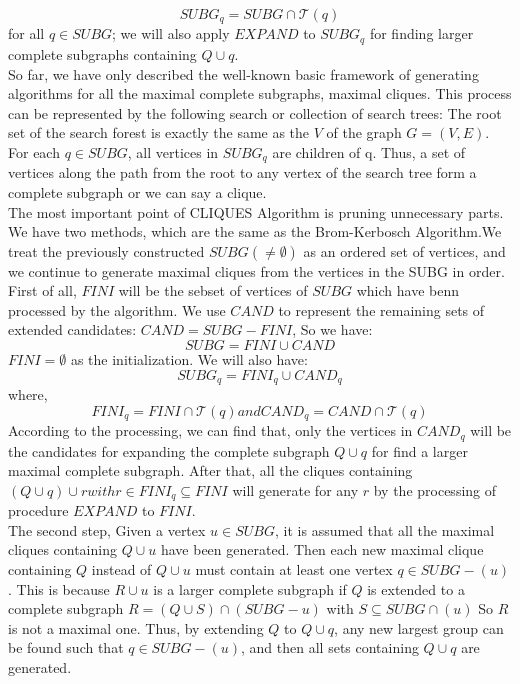 \begin{displaymath}
SUBG_q = SUBG \cap \mathcal{T}(q)
\end{displaymath}
for all $q \in SUBG$; we will also apply $EXPAND$ to $SUBG_q$ for finding larger complete subgraphs containing $Q\cup{q}$.\\
So far, we have only described the well-known basic framework of generating algorithms for all the maximal complete subgraphs, maximal cliques. This process can be represented by the following search or collection of search trees: The root set of the search forest is exactly the same as the $V$ of the graph $G = (V, E)$. For each $q \in SUBG$, all vertices in $SUBG_q$ are children of q. Thus, a set of vertices along the path from the root to any vertex of the search tree form a complete subgraph or we can say a clique.\\
The most important point of CLIQUES Algorithm is pruning unnecessary parts. We have two methods, which are the same as the Brom-Kerbosch Algorithm.We treat the previously constructed $SUBG(\ne \emptyset)$ as an ordered set of vertices, and we continue to generate maximal cliques from the vertices in the SUBG in order.\\
First of all, $FINI$ will be the sebset of vertices of $SUBG$ which have benn processed by the algorithm. We use $CAND$ to represent the remaining sets of extended candidates: $CAND = SUBG-FINI$, So we have:
\begin{displaymath}
SUBG = FINI \cup CAND
\end{displaymath}
$FINI = \emptyset$ as the initialization. We will also have:
\begin{displaymath}
SUBG_q = FINI_q \cup CAND_q
\end{displaymath}
where,
\begin{displaymath}
FINI_q = FINI \cap \mathcal{T}(q) and CAND_q = CAND \cap \mathcal{T}(q)
\end{displaymath}
According to the processing, we can find that, only the vertices in $CAND_q$ will be the candidates for expanding the complete subgraph $Q\cup{q}$ for find a larger maximal complete subgraph. After that, all the cliques containing $(Q\cup{q})\cup{r}with r\in FINI_q \subseteq FINI$ will generate for any $r$ by the processing of procedure $EXPAND$ to $FINI$.\\
The second step, Given a vertex $u \in SUBG$, it is assumed that all the maximal cliques containing $Q \cup {u}$ have been generated. Then each new maximal clique containing $Q$ instead of $Q \cup {u}$ must contain at least one vertex $q \in SUBG - (u)$. This is because $R \cup {u}$ is a larger complete subgraph if $Q$ is extended to a complete subgraph $R = (Q\cup S) \cap (SUBG - {u})$ with $S \subseteq SUBG \cap (u)$ So $R$ is not a maximal one. Thus, by extending $Q$ to $Q \cup {q}$, any new largest group can be found such that $q \in SUBG - (u)$, and then all sets containing $Q \cup {q}$ are generated.\\
